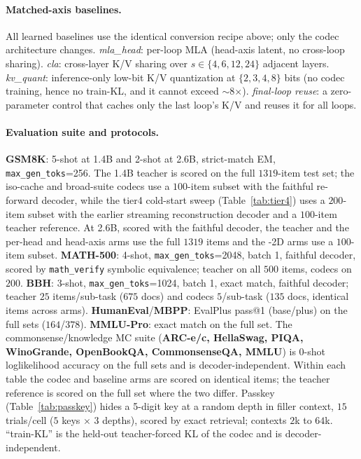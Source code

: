 {\paragraph{Matched-axis baselines.} All learned baselines use the identical conversion recipe
above; only the codec architecture changes. \emph{mla\_head}: per-loop MLA (head-axis latent,
no cross-loop sharing). \emph{cla}: cross-layer K/V sharing over $s\in\{4,6,12,24\}$ adjacent
layers. \emph{kv\_quant}: inference-only low-bit K/V quantization at $\{2,3,4,8\}$ bits (no codec
training, hence no train-KL, and it cannot exceed $\sim$8$\times$). \emph{final-loop reuse}: a
zero-parameter control that caches only the last loop's K/V and reuses it for all loops.

\paragraph{Evaluation suite and protocols.} \textbf{GSM8K}: 5-shot at 1.4B and 2-shot at 2.6B,
strict-match EM, \texttt{max\_gen\_toks}=256. The 1.4B teacher is scored on the full $1319$-item
test set; the iso-cache and broad-suite codecs use a $100$-item subset with the faithful re-forward
decoder, while the tier4 cold-start sweep (Table~\ref{tab:tier4}) uses a $200$-item subset with the
earlier streaming reconstruction decoder and a $100$-item teacher reference. At 2.6B, scored with the
faithful decoder, the teacher and the per-head and head-axis arms use the full $1319$ items and the
\lla{}-2D arms use a $100$-item subset. \textbf{MATH-500}: 4-shot, \texttt{max\_gen\_toks}=2048,
batch 1, faithful decoder, scored by \texttt{math\_verify} symbolic equivalence; teacher on all
$500$ items, codecs on $200$. \textbf{BBH}: 3-shot, \texttt{max\_gen\_toks}=1024, batch 1, exact
match, faithful decoder; teacher $25$ items/sub-task ($675$ docs) and codecs $5$/sub-task ($135$
docs, identical items across arms). \textbf{HumanEval}/\textbf{MBPP}: EvalPlus pass@1 (base/plus)
on the full sets ($164$/$378$). \textbf{MMLU-Pro}: exact match on the full set. The
commonsense/knowledge MC suite (\textbf{ARC-e/c, HellaSwag, PIQA, WinoGrande, OpenBookQA,
CommonsenseQA, MMLU}) is 0-shot loglikelihood accuracy on the full sets and is decoder-independent.
Within each table the codec and baseline arms are scored on identical items; the teacher reference
is scored on the full set where the two differ.
Passkey (Table~\ref{tab:passkey}) hides a 5-digit key at a random depth in filler context, $15$
trials/cell ($5$ keys $\times$ $3$ depths), scored by exact retrieval; contexts $2$k to $64$k.
``train-KL'' is the held-out teacher-forced KL of the codec and is decoder-independent.

}
